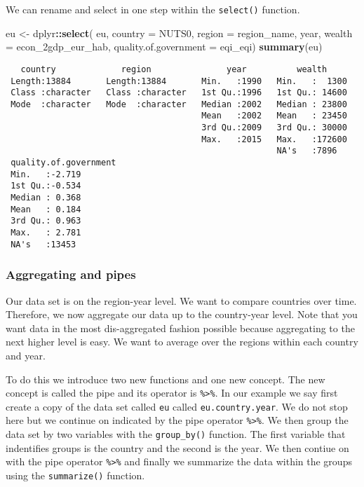 \documentclass[]{article}
\newenvironment{Shaded}{\begin{snugshade}}{\end{snugshade}}
\newcommand{\DataTypeTok}[1]{\textcolor[rgb]{0.13,0.29,0.53}{#1}}
\newcommand{\KeywordTok}[1]{\textcolor[rgb]{0.13,0.29,0.53}{\textbf{#1}}}
\newcommand{\NormalTok}[1]{#1}
\newcommand{\OperatorTok}[1]{\textcolor[rgb]{0.81,0.36,0.00}{\textbf{#1}}}
\newcommand{\StringTok}[1]{\textcolor[rgb]{0.31,0.60,0.02}{#1}}
\begin{document}
We can rename and select in one step within the \texttt{select()} function.

\begin{Shaded}
\begin{Highlighting}[]
\NormalTok{eu <-}\StringTok{ }\NormalTok{dplyr}\OperatorTok{::}\KeywordTok{select}\NormalTok{(}
\NormalTok{  eu,}
  \DataTypeTok{country =}\NormalTok{ NUTS0,}
  \DataTypeTok{region =}\NormalTok{ region_name,}
\NormalTok{  year,}
  \DataTypeTok{wealth =}\NormalTok{ econ_2gdp_eur_hab,}
  \DataTypeTok{quality.of.government =}\NormalTok{ eqi_eqi)}
\KeywordTok{summary}\NormalTok{(eu)}
\end{Highlighting}
\end{Shaded}

\begin{verbatim}
   country             region               year          wealth      
 Length:13884       Length:13884       Min.   :1990   Min.   :  1300  
 Class :character   Class :character   1st Qu.:1996   1st Qu.: 14600  
 Mode  :character   Mode  :character   Median :2002   Median : 23800  
                                       Mean   :2002   Mean   : 23450  
                                       3rd Qu.:2009   3rd Qu.: 30000  
                                       Max.   :2015   Max.   :172600  
                                                      NA's   :7896    
 quality.of.government
 Min.   :-2.719       
 1st Qu.:-0.534       
 Median : 0.368       
 Mean   : 0.184       
 3rd Qu.: 0.963       
 Max.   : 2.781       
 NA's   :13453        
\end{verbatim}

\hypertarget{aggregating-and-pipes}{%
\subsubsection{Aggregating and pipes}\label{aggregating-and-pipes}}

Our data set is on the region-year level. We want to compare countries over time. Therefore, we now aggregate our data up to the country-year level. Note that you want data in the most dis-aggregated fashion possible because aggregating to the next higher level is easy. We want to average over the regions within each country and year.

To do this we introduce two new functions and one new concept. The new concept is called the pipe and its operator is \texttt{\%\textgreater{}\%}. In our example we say first create a copy of the data set called \texttt{eu} called \texttt{eu.country.year}. We do not stop here but we continue on indicated by the pipe operator \texttt{\%\textgreater{}\%}. We then group the data set by two variables with the \texttt{group\_by()} function. The first variable that indentifies groups is the country and the second is the year. We then contiue on with the pipe operator \texttt{\%\textgreater{}\%} and finally we summarize the data within the groups using the \texttt{summarize()} function.
\end{document}
